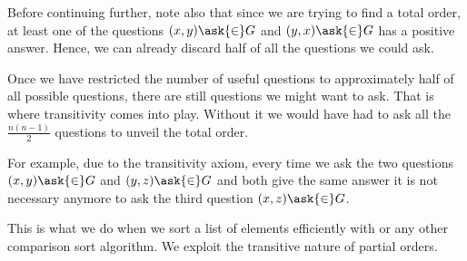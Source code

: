 Before continuing further, note also that since we are trying to find a total
order, at least one of the questions $(x, y) \ask{\in} G$ and $(y, x)
\ask{\in} G$ has a positive answer. Hence, we can already discard
half of all the questions we could ask.

Once we have restricted the number of useful questions to approximately
half of all possible questions, there are still  questions we
might want to ask. That is where transitivity comes into play. Without it we
would have had to ask all the $\frac{n (n-1)}{2}$ questions to unveil the total
order.

For example, due to the transitivity axiom, every time we ask the two questions
$(x, y) \ask{\in} G$ and $(y, z) \ask{\in} G$ and both give the
same answer it is not necessary anymore to ask the third question $(x, z)
\ask{\in} G$.

This is what we do when we sort a list of elements
efficiently with \mergesort or any other  comparison sort
algorithm. We exploit the transitive nature of partial orders.
